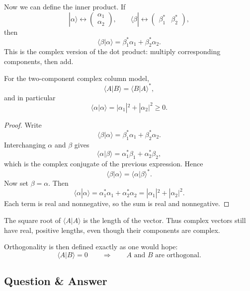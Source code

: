 Now we can define the inner product. If
\[
|\alpha\rangle \leftrightarrow
\begin{pmatrix}
\alpha_1\\
\alpha_2
\end{pmatrix},
\qquad
\langle\beta| \leftrightarrow
\begin{pmatrix}
\beta_1^* & \beta_2^*
\end{pmatrix},
\]
then
\begin{equation}
\langle \beta|\alpha\rangle
=
\beta_1^*\alpha_1+\beta_2^*\alpha_2.
\end{equation}
This is the complex version of the dot product: multiply corresponding components, then add.

\begin{proposition}
For the two-component complex column model,
\begin{equation}
\langle A|B\rangle=\langle B|A\rangle^*,
\end{equation}
and in particular
\begin{equation}
\langle \alpha|\alpha\rangle
=
|\alpha_1|^2+|\alpha_2|^2 \ge 0.
\end{equation}
\end{proposition}

\begin{proof}
Write
\[
\langle \beta|\alpha\rangle=\beta_1^*\alpha_1+\beta_2^*\alpha_2.
\]
Interchanging \(\alpha\) and \(\beta\) gives
\[
\langle \alpha|\beta\rangle=\alpha_1^*\beta_1+\alpha_2^*\beta_2,
\]
which is the complex conjugate of the previous expression. Hence
\[
\langle \beta|\alpha\rangle=\langle \alpha|\beta\rangle^*.
\]
Now set \(\beta=\alpha\). Then
\[
\langle \alpha|\alpha\rangle=\alpha_1^*\alpha_1+\alpha_2^*\alpha_2
=|\alpha_1|^2+|\alpha_2|^2.
\]
Each term is real and nonnegative, so the sum is real and nonnegative.
\end{proof}

The square root of \(\langle A|A\rangle\) is the length of the vector. Thus complex vectors still have real, positive lengths, even though their components are complex.

Orthogonality is then defined exactly as one would hope:
\begin{equation}
\langle A|B\rangle=0
\qquad\Longrightarrow\qquad
A \text{ and } B \text{ are orthogonal.}
\end{equation}

\subsection{Question \& Answer}

